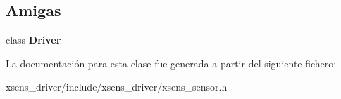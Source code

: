 \subsection*{\-Amigas}
\begin{DoxyCompactItemize}
\item 
\hypertarget{classxsens_1_1Sensor_aa486dd31a76947b501426d11b1d6c700}{class {\bfseries \-Driver}}\label{classxsens_1_1Sensor_aa486dd31a76947b501426d11b1d6c700}

\end{DoxyCompactItemize}


\-La documentación para esta clase fue generada a partir del siguiente fichero\-:\begin{DoxyCompactItemize}
\item 
xsens\-\_\-driver/include/xsens\-\_\-driver/xsens\-\_\-sensor.\-h\end{DoxyCompactItemize}
